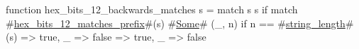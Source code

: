 function hex_bits_12_backwards_matches s = match s {
  s if match #\hyperref[sailRISCVzhexzybitszy12zymatcheszyprefix]{hex\_bits\_12\_matches\_prefix}#(s) {
    #\hyperref[sailRISCVzSome]{Some}# (_, n) if n == #\hyperref[sailRISCVzstringzylength]{string\_length}#(s) => true,
    _ => false
  } => true,
  _ => false
}
